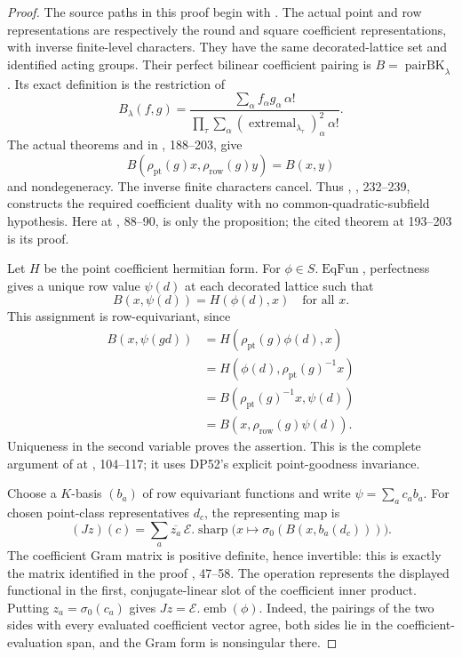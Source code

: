 \begin{proof}
The source paths in this proof begin with
.
The actual point and row representations are respectively the round
and square coefficient representations, with inverse finite-level
characters. They have the same decorated-lattice set and identified
acting groups.
Their perfect bilinear coefficient pairing is
$B=\operatorname{pairBK}_\lambda$.
Its exact definition is the restriction of
\[
 B_\lambda(f,g)=
 \frac{\sum_\alpha f_\alpha g_\alpha\,\alpha!}
 {\prod_\tau\sum_\alpha
       (\operatorname{extremal}_{\lambda_\tau})_\alpha^2\,\alpha!}.
\]
The actual theorems  and
 in ,
188--203, give
\[
 B(\rho_{\mathrm{pt}}(g)x,\rho_{\mathrm{row}}(g)y)=B(x,y)
\]
and nondegeneracy. The inverse finite characters cancel.
Thus , , 232--239, constructs the
required coefficient duality with no common-quadratic-subfield hypothesis.
Here  at , 88--90, is only the
proposition; the cited theorem at 193--203 is its proof.

Let $H$ be the point coefficient hermitian form.
For $\phi\in S.\operatorname{EqFun}$, perfectness gives a unique
row value $\psi(d)$ at each decorated lattice such that
\[
 B(x,\psi(d))=H(\phi(d),x)\quad\text{for all }x.
\]
This assignment is row-equivariant, since
\[
 \begin{aligned}
 B(x,\psi(gd))
 &=H(\rho_{\mathrm{pt}}(g)\phi(d),x)\\
 &=H(\phi(d),\rho_{\mathrm{pt}}(g)^{-1}x)\\
 &=B(\rho_{\mathrm{pt}}(g)^{-1}x,\psi(d))\\
 &=B(x,\rho_{\mathrm{row}}(g)\psi(d)).
 \end{aligned}
\]
Uniqueness in the second variable proves the assertion.
This is the complete argument of  at
, 104--117; it uses DP52's explicit point-goodness
invariance.

Choose a $K$-basis $(b_a)$ of row equivariant functions and write
$\psi=\sum_a c_ab_a$.
For chosen point-class representatives $d_c$, the representing map is
\[
 (Jz)(c)=\sum_a\overline{z_a}\,
  \mathcal E.\operatorname{sharp}
  \bigl(x\longmapsto\sigma_0(B(x,b_a(d_c)))\bigr).
\]
The coefficient Gram matrix is positive definite, hence invertible:
this is exactly the matrix identified in the proof
, 47--58.
The operation  represents the displayed functional in the
first, conjugate-linear slot of the coefficient inner product.
Putting $z_a=\sigma_0(c_a)$ gives
$Jz=\mathcal E.\operatorname{emb}(\phi)$.
Indeed, the pairings of the two sides with every evaluated coefficient
vector agree, both sides lie in the coefficient-evaluation span, and
the Gram form is nonsingular there.


\end{proof}
